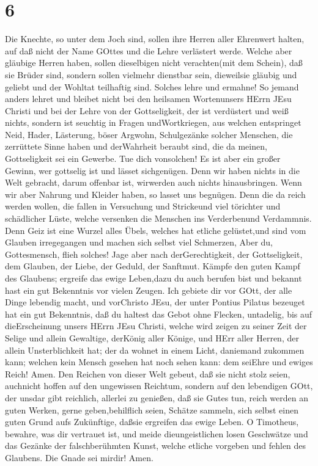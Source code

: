 \hypertarget{section-5}{%
\section{6}\label{section-5}}

 Die Knechte, so unter dem Joch sind, sollen ihre Herren
aller Ehrenwert halten, auf daß nicht der Name GOttes und die Lehre
verlästert werde.  Welche aber gläubige Herren haben, sollen
dieselbigen nicht verachten(mit dem Schein), daß sie Brüder sind,
sondern sollen vielmehr dienstbar sein, dieweilsie gläubig und geliebt
und der Wohltat teilhaftig sind. Solches lehre und ermahne! 
So jemand anders lehret und bleibet nicht bei den heilsamen Wortenunsers
HErrn JEsu Christi und bei der Lehre von der Gottseligkeit, 
der ist verdüstert und weiß nichts, sondern ist seuchtig in Fragen
undWortkriegen, aus welchen entspringet Neid, Hader, Lästerung, böser
Argwohn,  Schulgezänke solcher Menschen, die zerrüttete
Sinne haben und derWahrheit beraubt sind, die da meinen, Gottseligkeit
sei ein Gewerbe. Tue dich vonsolchen!  Es ist aber ein
großer Gewinn, wer gottselig ist und lässet sichgenügen. 
Denn wir haben nichts in die Welt gebracht, darum offenbar ist,
wirwerden auch nichts hinausbringen.  Wenn wir aber Nahrung
und Kleider haben, so lasset uns begnügen.  Denn die da
reich werden wollen, die fallen in Versuchung und Strickeund viel
törichter und schädlicher Lüste, welche versenken die Menschen ins
Verderbenund Verdammnis.  Denn Geiz ist eine Wurzel alles
Übels, welches hat etliche gelüstet,und sind vom Glauben irregegangen
und machen sich selbst viel Schmerzen,  Aber du,
Gottesmensch, flieh solches! Jage aber nach derGerechtigkeit, der
Gottseligkeit, dem Glauben, der Liebe, der Geduld, der Sanftmut.
 Kämpfe den guten Kampf des Glaubens; ergreife das ewige
Leben,dazu du auch berufen bist und bekannt hast ein gut Bekenntnis vor
vielen Zeugen.  Ich gebiete dir vor GOtt, der alle Dinge
lebendig macht, und vorChristo JEsu, der unter Pontius Pilatus bezeuget
hat ein gut Bekenntnis,  daß du haltest das Gebot ohne
Flecken, untadelig, bis auf dieErscheinung unsers HErrn JEsu Christi,
 welche wird zeigen zu seiner Zeit der Selige und allein
Gewaltige, derKönig aller Könige, und HErr aller Herren, 
der allein Unsterblichkeit hat; der da wohnet in einem Licht, daniemand
zukommen kann; welchen kein Mensch gesehen hat noch sehen kann: dem
seiEhre und ewiges Reich! Amen.  Den Reichen von dieser
Welt gebeut, daß sie nicht stolz seien, auchnicht hoffen auf den
ungewissen Reichtum, sondern auf den lebendigen GOtt, der unsdar gibt
reichlich, allerlei zu genießen,  daß sie Gutes tun, reich
werden an guten Werken, gerne geben,behilflich seien, 
Schätze sammeln, sich selbst einen guten Grund aufs Zukünftige, daßsie
ergreifen das ewige Leben.  O Timotheus, bewahre, was dir
vertrauet ist, und meide dieungeistlichen losen Geschwätze und das
Gezänke der falschberühmten Kunst,  welche etliche vorgeben
und fehlen des Glaubens. Die Gnade sei mirdir! Amen.
